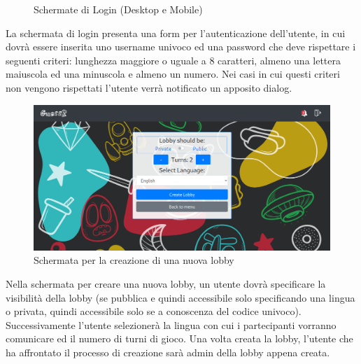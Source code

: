 \begin{figure}[H]
\begin{minipage}[b]{0.2\textwidth}
  \end{minipage}
  \caption{Schermate di Login (Desktop e Mobile)}
\end{figure}

\noindent La schermata di login presenta una form per l'autenticazione dell'utente, in cui dovrà essere inserita uno username univoco ed una password che deve rispettare i seguenti criteri: lunghezza maggiore o uguale a 8 caratteri, almeno una lettera maiuscola ed una minuscola e almeno un numero. Nei casi in cui questi criteri non vengono rispettati l'utente verrà notificato un apposito dialog. 


\begin{figure}[H]
    \centering
    \includegraphics[width=1\linewidth]{img/screen/LobbyCreation.png}
    \caption{Schermata per la creazione di una nuova lobby} 
\end{figure}

Nella schermata per creare una nuova lobby, un utente dovrà specificare la visibilità della lobby (se pubblica e quindi accessibile solo specificando una lingua o privata, quindi accessibile solo se a conoscenza del codice univoco). Successivamente l'utente selezionerà la lingua con cui i partecipanti vorranno comunicare ed il numero di turni di gioco. Una volta creata la lobby, l'utente che ha affrontato il processo di creazione sarà admin della lobby appena creata.

